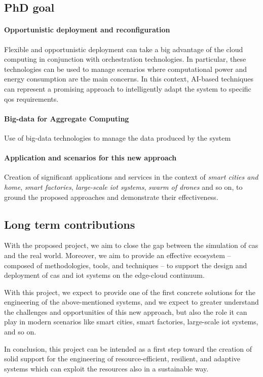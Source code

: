 \documentclass[12pt]{article}
\newcommand{\meta}[1]{{\color{blue}#1}}
\begin{document}
\subsection{PhD goal}

\paragraph{Opportunistic deployment and reconfiguration}
\meta{
Flexible and opportunistic deployment can take a big advantage of the cloud
computing in conjunction with orchestration technologies.
%
In particular, these technologies can be used to manage scenarios where
computational power and energy consumption are the main concerns.
%
In this context, AI-based techniques can represent a promising
approach to intelligently adapt the system to specific \ac{qos} requirements.
}

\paragraph{Big-data for Aggregate Computing}
\meta{
Use of big-data technologies to manage the data produced by the system
}

\paragraph{Application and scenarios for this new approach}
Creation of significant applications and services in the context of \emph{smart cities and home},
\emph{smart factories}, \emph{large-scale \ac{iot} systems}, \emph{swarm of drones} and so on,
to ground the proposed approaches and demonstrate their effectiveness.

\subsection{Long term contributions}
\meta{
With the proposed project, we aim to close the gap between the simulation of \ac{cas} and the real world.
%
Moreover, we aim to provide an effective ecosystem -- composed of methodologies, tools, and techniques --
to support the design and deployment of \ac{cas} and \ac{iot} systems on the edge-cloud continuum.

With this project,
we expect to provide one of the first concrete solutions for the engineering of the above-mentioned systems,
and we expect to greater understand the challenges and opportunities of this new approach,
but also the role it can play in modern scenarios like smart cities, smart factories, large-scale \ac{iot} systems, and so on.

In conclusion,
this project can be intended as a first step toward the creation of solid support
for the engineering of resource-efficient, resilient, and adaptive systems
which can exploit the resources also in a sustainable way.
}

\newpage

\printbibliography
\end{document}
